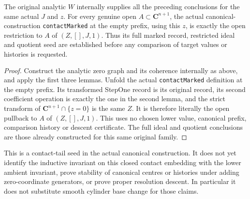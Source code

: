 \begin{theorem}
\label{hir:actual-original-zero-coordinate-contact-tail-seed}
\leanok
The original analytic $W$ internally supplies all the preceding
conclusions for the same actual $J$ and $z$. For every genuine open
$A\subset\mathbf C^{n+1}$, the actual canonical-construction
\texttt{contactMarked} at the empty prefix, using this $z$, is
exactly the open restriction to $A$ of $(Z,[],J,1)$. Thus its full
marked record, restricted ideal and quotient seed are established
before any comparison of target values or histories is requested.
\end{theorem}
\begin{proof}
Construct the analytic zero graph and its coherence internally as
above, and apply the first three lemmas. Unfold the actual
\texttt{contactMarked} definition at the empty prefix. Its
transformed StepOne record is its original record, its second
coefficient operation is exactly the one in the second lemma, and
the strict transform of $\mathbf C^{n+1}\cap\{z=0\}$ is the same
$Z$. It is therefore literally the open pullback to $A$ of
$(Z,[],J,1)$. This uses no chosen lower value, canonical prefix,
comparison history or descent certificate. The full ideal and
quotient conclusions are those already constructed for this same
original family.
\end{proof}

This is a contact-tail seed in the actual canonical construction.
It does not yet identify the inductive invariant on this closed
contact embedding with the lower ambient invariant, prove stability
of canonical centres or histories under adding zero-coordinate
generators, or prove proper resolution descent. In particular it
does not substitute smooth cylinder base change for those claims.
